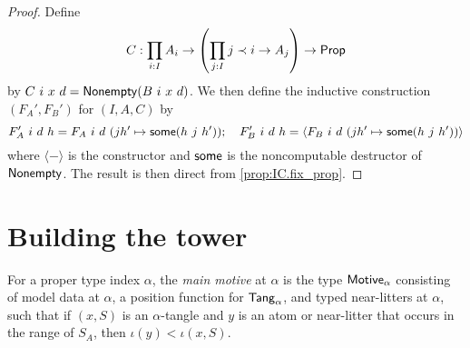 \begin{proof}
  Define
  \[ C : \prod_{i : I} A_i \to \left(\prod_{j : I} j \prec i \to A_j\right) \to \mathsf{Prop} \]
  by \( C\ i\ x\ d = \newoperator{Nonempty}(B\ i\ x\ d) \).
  We then define the inductive construction \( (F_A', F_B') \) for \( (I, A, C) \) by
  \[ F_A'\ i\ d\ h = F_A\ i\ d\ (j h' \mapsto \newoperator{some}(h\ j\ h'));\quad F_B'\ i\ d\ h = \langle F_B\ i\ d\ (j h' \mapsto \newoperator{some}(h\ j\ h')) \rangle \]
  where \( \langle-\rangle \) is the constructor and \( \operatorname{\mathsf{some}} \) is the noncomputable destructor of \( \operatorname{\mathsf{Nonempty}} \).
  The result is then direct from \cref{prop:IC.fix_prop}.
\end{proof}

\section{Building the tower}
\begin{definition}
  \label{def:MainMotive}
  For a proper type index \( \alpha \), the \emph{main motive} at \( \alpha \) is the type \( \mathsf{Motive}_\alpha \) consisting of model data at \( \alpha \), a position function for \( \mathsf{Tang}_\alpha \), and typed near-litters at \( \alpha \), such that if \( (x, S) \) is an \( \alpha \)-tangle and \( y \) is an atom or near-litter that occurs in the range of \( S_A \), then \( \iota(y) < \iota(x, S) \).
\end{definition}

